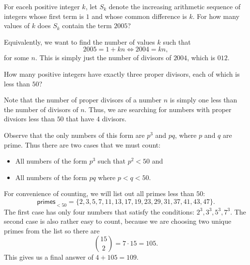 \documentclass[a4paper, 12pt]{article}
\begin{document}
\begin{chirpbox}
\begin{problemnum}
    For eaceh positive integer \( k \), let \( S_k \) denote the increasing arithmetic sequence of integers whose first term is \( 1 \) and whose common difference is \( k \). For how many values of \( k \) does \( S_k \) contain the term \( 2005 \)?
\end{problemnum}
\end{chirpbox}

\begin{solution}
    Equivalently, we want to find the number of values \( k \) such that
    \[
        2005 = 1 + k n \iff 2004 = kn
    ,\]
    for some \( n \). This is simply just the number of divisors of \( 2004 \), which is \( \boxed{012} \).
\end{solution}

\begin{chirpbox}
    \begin{problemnum}
        How many positive integers have exactly three proper divisors, each of which is less than \( 50 \)?
    \end{problemnum}
\end{chirpbox}

\begin{solution}
    Note that the number of proper divisors of a number \( n \) is simply one less than the number of divisors of \( n \). Thus, we are searching for numbers with proper divsiors less than \( 50 \) that have \( 4 \) divisors.

    Observe that the only numbers of this form are \( p^3 \) and \( pq \), where \( p \) and \( q \) are prime. Thus there are two cases that we must count:
    \begin{itemize}
        \item All numbers of the form \( p^3 \) such that \( p^2 < 50 \) and
        \item All numbers of the form \( pq \) where \( p < q < 50 \).
    \end{itemize}
    For convenience of counting, we will list out all primes less than \( 50 \):
    \[
        \textsf{primes}_{< 50} = \{2, 3, 5, 7, 11, 13, 17, 19, 23, 29, 31, 37, 41, 43, 47\}
    .\]
    The first case has only four numbers that satisfy the conditions: \( 2^3, 3^3, 5^3, 7^3 \). The second case is also rather easy to count, because we are choosing two unique primes from the list so there are
    \[
        \binom{15}{2} = 7 \cdot 15 = 105
    .\]
    This gives us a final answer of \( 4 + 105 = \boxed{109} \).
\end{solution}
\end{document}
